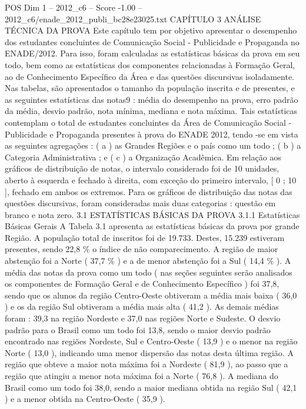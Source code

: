 \begin{textsample}{POS Dim 1 – 2012\_c6 – Score -1.00 – 2012\_c6/enade\_2012\_publi\_bc28e23025.txt}  \label{ex:f1_pos_184}
CAPÍTULO 3 ANÁLISE TÉCNICA DA PROVA Este capítulo tem por objetivo apresentar o desempenho dos estudantes concluintes de Comunicação Social - Publicidade e Propaganda no ENADE/2012.
Para isso, foram calculadas as estatísticas básicas da prova em seu todo, bem como as estatísticas dos componentes relacionadas à Formação Geral, ao de Conhecimento Específico da Área e das questões discursivas isoladamente.
Nas tabelas, são apresentados o tamanho da população inscrita e de presentes, e as seguintes estatísticas das notas9 : média do desempenho na prova, erro padrão da média, desvio padrão, nota mínima, mediana e nota máxima.
Tais estatísticas contemplam o total de estudantes concluintes da Área de Comunicação Social - Publicidade e Propaganda presentes à prova do ENADE 2012, tendo -se em vista as seguintes agregações : ( a ) as Grandes Regiões e o país como um todo ; ( b ) a Categoria Administrativa ; e ( c ) a Organização Acadêmica.
Em relação aos gráficos de distribuição de notas, o intervalo considerado foi de 10 unidades, aberto à esquerda e fechado à direita, com exceção do primeiro intervalo, [ 0 ; 10 ], fechado em ambos os extremos.
Para os gráficos de distribuição das notas das questões discursivas, foram consideradas mais duas categorias : questão em branco e nota zero. 3.1 ESTATÍSTICAS BÁSICAS DA PROVA 3.1.1 Estatísticas Básicas Gerais A Tabela 3.1 apresenta as estatísticas básicas da prova por grande Região.
A população total de inscritos foi de 19.733.
Destes, 15.239 estiveram presentes, sendo 22,8 \% o índice de não comparecimento.
A região de maior abstenção foi a Norte ( 37,7 \% ) e a de menor abstenção foi a Sul ( 14,4 \% ).
A média das notas da prova como um todo ( nas seções seguintes serão analisados os componentes de Formação Geral e de Conhecimento Específico ) foi 37,8, sendo que os alunos da região Centro-Oeste obtiveram a média mais baixa ( 36,0 ) e os da região Sul obtiveram a média mais alta ( 41,2 ).
As demais médias foram : 39,3 na região Nordeste e 37,0 nas regiões Norte e Sudeste.
O desvio padrão para o Brasil como um todo foi 13,8, sendo o maior desvio padrão encontrado nas regiões Nordeste, Sul e Centro-Oeste ( 13,9 ) e o menor na região Norte ( 13,0 ), indicando uma menor dispersão das notas desta última região.
A região que obteve a maior nota máxima foi a Nordeste ( 81,9 ), ao passo que a região que atingiu a menor nota máxima foi a Norte ( 76,8 ).
A mediana do Brasil como um todo foi 38,0, sendo a maior mediana obtida na região Sul ( 42,1 ) e a menor obtida na Centro-Oeste ( 35,9 ).

\end{textsample}
